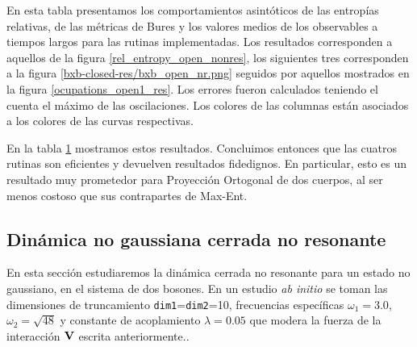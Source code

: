 \documentclass{report} %
\numberwithin{equation}{section}
\begin{document}
\begin{table}
\begin{tabular}{llllll}
        \bottomrule
     \end{tabular} 
    \begin{tablenotes}
      \small
      \item En esta tabla presentamos los comportamientos asintóticos de las entropías relativas, de las métricas de Bures y los valores medios de los observables a tiempos largos para las rutinas implementadas. Los resultados corresponden a aquellos de la figura \ref{rel_entropy_open_nonres}, los siguientes tres corresponden a la figura \ref{bxb-closed-res/bxb_open_nr.png} seguidos por aquellos mostrados en la figura \ref{ocupations_open1_res}. Los errores fueron calculados teniendo el cuenta el máximo de las oscilaciones. Los colores de las columnas están asociados a los colores de las curvas respectivas. 
    \end{tablenotes}
    \label{table3}
\end{table}

En la tabla \ref{table3} mostramos estos resultados. Concluimos entonces que las cuatros rutinas son eficientes y devuelven resultados fidedignos. En particular, esto es un resultado muy prometedor para Proyección Ortogonal de dos cuerpos, al ser menos costoso que sus contrapartes de Max-Ent.

\subsection{Dinámica no gaussiana cerrada no resonante}
\label{bxb_cnr}

En esta sección estudiaremos la dinámica cerrada no resonante para un estado no gaussiano, en el sistema de dos bosones. En un estudio \textit{ab initio} se toman las dimensiones de truncamiento \texttt{dim1}=\texttt{dim2}=10, frecuencias específicas $\omega_1 = 3.0$, $\omega_2 =\sqrt{48}$ y constante de acoplamiento $\lambda = 0.05$ que modera la fuerza de la interacción ${\bf V}$ escrita anteriormente.. 
\end{document}
